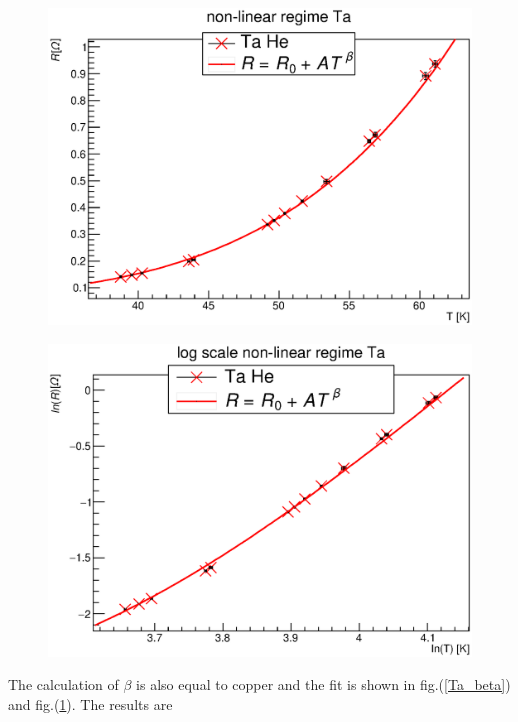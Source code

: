 \documentclass{article}
\begin{document}
\begin{figure}[H]
    \begin{minipage}{0.49\textwidth}
        \includegraphics[width=\textwidth]{Graphen/Ta.eps}
        \label{Ta_beta}
    \end{minipage}
    \begin{minipage}{0.49\textwidth}
        \includegraphics[width=\textwidth]{Graphen/ln_Ta.eps}
        \label{Ta_log}
    \end{minipage}
\end{figure}
The calculation of $\beta$ is also equal to copper and the fit is shown in fig.(\ref{Ta_beta}) and fig.(\ref{Ta_log}). The results are
\end{document}

